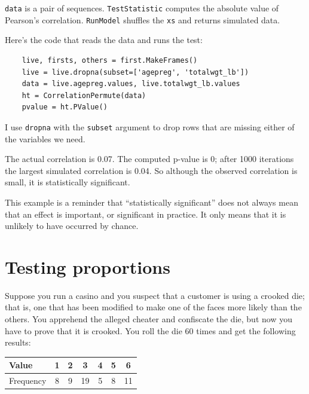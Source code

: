 \documentclass[12pt]{book}
\begin{document}
{\tt data} is a pair of sequences.  {\tt TestStatistic} computes the
absolute value of Pearson's correlation.  {\tt RunModel} shuffles the
{\tt xs} and returns simulated data.

Here's the code that reads the data and runs the test:

\begin{verbatim}
    live, firsts, others = first.MakeFrames()
    live = live.dropna(subset=['agepreg', 'totalwgt_lb'])
    data = live.agepreg.values, live.totalwgt_lb.values
    ht = CorrelationPermute(data)
    pvalue = ht.PValue()
\end{verbatim}

I use {\tt dropna} with the {\tt subset} argument to drop rows
that are missing either of the variables we need.

The actual correlation is 0.07.  The computed p-value is 0; after 1000
iterations the largest simulated correlation is 0.04.  So although the
observed correlation is small, it is statistically significant.
   

This example is a reminder that ``statistically significant'' does not
always mean that an effect is important, or significant in practice.
It only means that it is unlikely to have occurred by chance.


\section{Testing proportions}
\label{casino}

Suppose you run a casino and you suspect that a customer is
using a crooked die; that
is, one that has been modified to make one of the faces more
likely than the others.  You apprehend the alleged
cheater and confiscate the die, but now you have to prove that it
is crooked.  You roll the die 60 times and get the following results:

\begin{center}
\begin{tabular}{|l|c|c|c|c|c|c|}
\hline
Value     &  1  &  2  &  3  &  4  &  5  &  6  \\ 
\hline
Frequency &  8  &  9  &  19  &  5  &  8  &  11  \\
\hline
\end{tabular}
\end{center}
\end{document}
